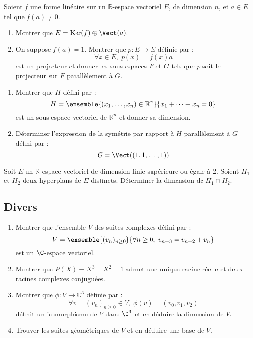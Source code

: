 \documentclass[a4paper,twoside,french,11pt]{VcCours}
\begin{document}
\begin{Exercice}{} Soient $f$ une forme linéaire sur un $\mathbb{R}$-espace vectoriel $E$, de dimension $n$, et $a\in E$ tel que $f(a)\neq 0$.
\begin{enumerate}
\item Montrer que $E=\textrm{Ker}(f)\oplus\Vect(a)$.
\item On suppose $f(a)=1$. Montrer que $p : E \rightarrow E$ définie par :
$$ \forall x \in E, \; p(x) = f(x) a $$
est un projecteur et donner les sous-espaces $F$ et $G$ tels que $p$ soit le projecteur sur $F$ parallèlement à $G$.
\end{enumerate}
\end{Exercice}


\begin{Exercice}{} 
\begin{enumerate}
\item Montrer que $H$ défini par :
$$ H = \ensemble{(x_1, \ldots, x_n)\in \mathbb{R}^n}{x_1 + \cdots + x_n = 0}$$
est un sous-espace vectoriel de $\mathbb{R}^n$ et donner sa dimension.
\item Déterminer l'expression de la symétrie par rapport à $H$ parallèlement à $G$ défini par :
$$ G = \Vect((1,1, \ldots, 1))$$
\end{enumerate}
\end{Exercice}



\begin{Exercice}{} Soit $E$ un $\mathbb{K}$-espace vectoriel de dimension finie supérieure ou égale à 2. Soient $H_1$ et $H_2$ deux hyperplans de $E$ distincts. Déterminer la dimension de $H_1 \cap H_2$.
\end{Exercice}

\newpage

\subsection{\large Divers}

\medskip

\begin{Exercice}{} \begin{enumerate}
 \item Montrer que l'ensemble $V$ des suites complexes défini par :
 $$ V = \ensemble{(v_n)_{n \geq 0}}{\forall n \geq 0, \; v_{n+3}=v_{n+2}+v_n}$$
est un $\C$-espace vectoriel.
 \item Montrer que $P(X)=X^3-X^2-1$ admet une unique racine réelle et deux racines complexes conjuguées.
 \item Montrer que $\phi : V \rightarrow \mathbb{C}^3$ définie par :
 $$ \forall v=(v_n)_{n \geq 0} \in V, \;\phi(v)=(v_0,v_1,v_2)$$
  définit un isomorphisme de $V$ dans $\C^3$ et en déduire la dimension de $V$.
 \item Trouver les suites géométriques de $V$ et en déduire une base de $V$.
\end{enumerate}
\end{Exercice}
\end{document}
